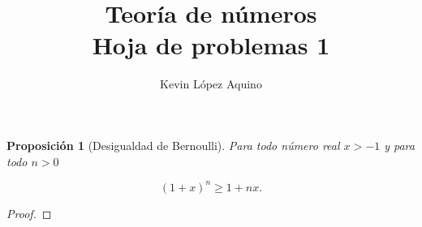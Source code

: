 \documentclass{article}
\newtheorem{proposition}{Proposición}
\begin{document}
\title{ \textbf{Teoría de números }\\
Hoja de problemas 1}
\author{Kevin L\'{o}pez Aquino}
\maketitle	

\begin{proposition}[Desigualdad de Bernoulli]
	Para todo número real $x > -1$ y para todo $n > 0$
	
	$$ (1 + x)^n \geq 1 + nx .$$
	
\end{proposition}

\begin{proof}
	
\end{proof}
\end{document}
